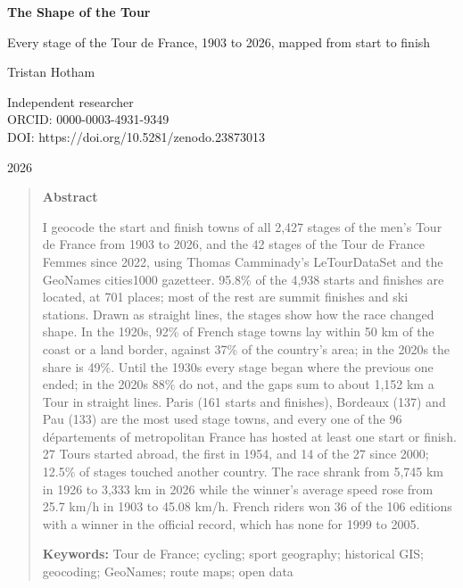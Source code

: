 \documentclass[11pt,a4paper]{article}
\begin{document}
\begin{center}
{\Large\bfseries The Shape of the Tour\par}
\vspace{0.4em}
{\large Every stage of the Tour de France, 1903 to 2026, mapped from start to finish\par}
\vspace{1.2em}
{\large Tristan Hotham\par}
\vspace{0.3em}
{\small Independent researcher\\
ORCID: 0000-0003-4931-9349\\
DOI: https://doi.org/10.5281/zenodo.23873013\par}
\vspace{0.8em}
2026
\end{center}

\begin{quote}
\small
\begin{center}\textbf{Abstract}\end{center}
I geocode the start and finish towns of all 2,427 stages of the men's Tour de France from 1903 to 2026, and the 42 stages of the Tour de France Femmes since 2022, using Thomas Camminady's LeTourDataSet and the GeoNames cities1000 gazetteer. 95.8\% of the 4,938 starts and finishes are located, at 701 places; most of the rest are summit finishes and ski stations. Drawn as straight lines, the stages show how the race changed shape. In the 1920s, 92\% of French stage towns lay within 50 km of the coast or a land border, against 37\% of the country's area; in the 2020s the share is 49\%. Until the 1930s every stage began where the previous one ended; in the 2020s 88\% do not, and the gaps sum to about 1,152 km a Tour in straight lines. Paris (161 starts and finishes), Bordeaux (137) and Pau (133) are the most used stage towns, and every one of the 96 départements of metropolitan France has hosted at least one start or finish. 27 Tours started abroad, the first in 1954, and 14 of the 27 since 2000; 12.5\% of stages touched another country. The race shrank from 5,745 km in 1926 to 3,333 km in 2026 while the winner's average speed rose from 25.7 km/h in 1903 to 45.08 km/h. French riders won 36 of the 106 editions with a winner in the official record, which has none for 1999 to 2005.

\textbf{Keywords:} Tour de France; cycling; sport geography; historical GIS; geocoding; GeoNames; route maps; open data
\end{quote}
\end{document}
